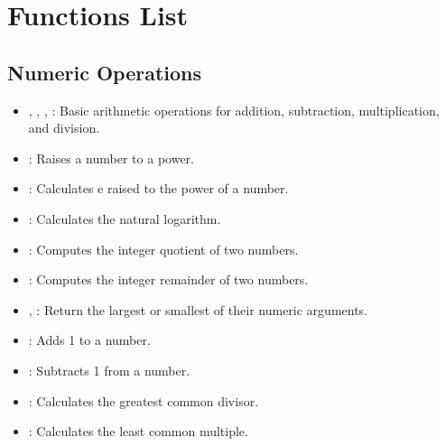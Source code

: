 \section{Functions List}

\subsection{Numeric Operations}
\begin{itemize}
    \item \code{+}, \code{-}, \code{*}, \code{/}: Basic arithmetic operations for addition, subtraction, multiplication, and division.
    \item \code{**}: Raises a number to a power.
    \item {}: Calculates e raised to the power of a number.
    \item {}: Calculates the natural logarithm.
    \item {}: Computes the integer quotient of two numbers.
    \item {}: Computes the integer remainder of two numbers.
    \item {}, : Return the largest or smallest of their numeric arguments.
    \item {}: Adds 1 to a number.
    \item {}: Subtracts 1 from a number.
    \item {}: Calculates the greatest common divisor.
    \item {}: Calculates the least common multiple.
\end{itemize}

